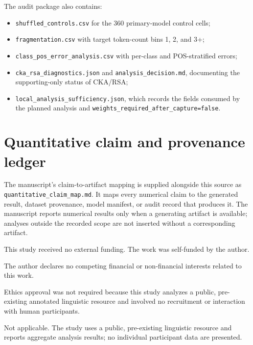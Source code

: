 \documentclass[pdflatex,sn-basic]{sn-jnl}
\begin{document}
The audit package also contains:

\begin{itemize}
    \item \texttt{shuffled\_controls.csv} for the 360 primary-model control
    cells;
    \item \texttt{fragmentation.csv} with target token-count bins 1, 2, and
    3+;
    \item \texttt{class\_pos\_error\_analysis.csv} with per-class and
    POS-stratified errors;
    \item \texttt{cka\_rsa\_diagnostics.json} and
    \texttt{analysis\_decision.md}, documenting the supporting-only status of
    CKA/RSA;
    \item \texttt{local\_analysis\_sufficiency.json}, which records the
    fields consumed by the planned analysis and
    \texttt{weights\_required\_after\_capture=false}.
\end{itemize}

\section{Quantitative claim and provenance ledger}\label{app:ledger}

The manuscript's claim-to-artifact mapping is supplied alongside this source
as \texttt{quantitative\_claim\_map.md}. It maps every numerical claim to the
generated result, dataset provenance, model manifest, or audit record that
produces it. The manuscript reports numerical results only when a generating
artifact is available; analyses outside the recorded scope are not inserted
without a corresponding artifact.

\backmatter


This study received no external funding. The work was self-funded by the
author.

The author declares no competing financial or non-financial interests related
to this work.

Ethics approval was not required because this study analyzes a public,
pre-existing annotated linguistic resource and involved no recruitment or
interaction with human participants.

Not applicable. The study uses a public, pre-existing linguistic resource and
reports aggregate analysis results; no individual participant data are
presented.
\end{document}
